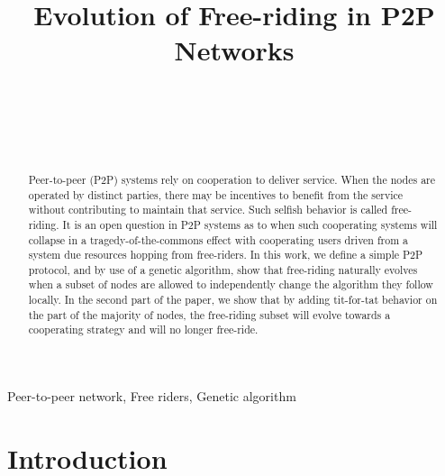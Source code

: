 \documentclass[12pt,journal,draftcls,letterpaper,onecolumn]{IEEEtran}
\begin{document}
\title{Evolution of Free-riding in P2P Networks}
\author{\\
\\
\and
{}\\
}
\maketitle

\begin{abstract}

Peer-to-peer (P2P) systems rely on cooperation to deliver service. When the
nodes are operated by distinct parties, there may be incentives to benefit 
from the service without contributing to maintain that service. 
Such selfish behavior is called free-riding. It is an open question in P2P systems 
as to when such cooperating systems will collapse in a tragedy-of-the-commons effect
with cooperating users driven from a system due resources hopping from free-riders.
In this work, we define a simple P2P protocol, and by use of a genetic algorithm, 
show that free-riding naturally evolves when a subset of nodes are allowed to independently 
change the algorithm they follow locally. In the second part of the paper, we show that
by adding tit-for-tat behavior on the part of the majority of nodes, the free-riding subset
will evolve towards a cooperating strategy and will no longer free-ride.
\end{abstract}

\begin{IEEEkeywords}
Peer-to-peer network, Free riders, Genetic algorithm
\end{IEEEkeywords}

\IEEEpeerreviewmaketitle
\section{Introduction}\label{sec:introduction}
\end{document}
